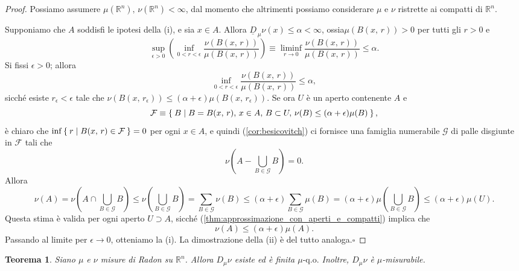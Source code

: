 \documentclass[a4paper,10pt,openright,oneside]{book}
\theoremstyle{theoremstyle}
\newtheorem{teorema}{Teorema}[section]
\theoremstyle{theoremstylewoheader}
\theoremstyle{theoremstyle}
\theoremstyle{proofsecstyle}
\theoremstyle{nonumberplain}
\newtheorem{proof}{Dim.}
\newcommand{\FF}{\ensuremath{\mathcal{F}}}
\newcommand{\GG}{\ensuremath{\mathcal{G}}}
\newcommand{\RR}{\ensuremath{\mathbb{R}}}
\newcommand{\lDer}[2]{\ensuremath{\underline{D}_{\,#2} #1}}
\newcommand{\Der}[2]{\ensuremath{D_#2 #1}}
\newcommand{\qo}[1]{\ensuremath{#1\text{-q.o.}}}
\renewcommand{\qedsymbol}{\ensuremath{\square}}
\newcommand{\qed}{\unskip\nobreak\hfill\nobreak\hspace{.5em}\qedsymbol}
\begin{document}
\begin{proof}
Possiamo assumere $\mu(\RR^n),\, \nu(\RR^n) < \infty$, dal momento che altrimenti possiamo considerare $\mu$ e $\nu$ ristrette ai compatti di $\RR^n$.

Supponiamo che $A$ soddisfi le ipotesi della (i), e sia $x \in A$. Allora $\lDer{\nu}{\mu}(x) \le \alpha < \infty$, ossia\linebreak $\mu(B(x,\, r)) > 0$ per tutti gli $r > 0$ e
\[
\sup_{\epsilon > 0} \left(\inf_{0 < r < \epsilon} \frac{\nu(B(x,\, r))}{\mu(B(x,\, r))}\right) \equiv \liminf_{r \to 0} \frac{\nu(B(x,\, r))}{\mu(B(x,\, r))} \le \alpha.
\]
Si fissi $\epsilon > 0$; allora
\[
\inf_{0 < r < \epsilon} \frac{\nu(B(x,\, r))}{\mu(B(x,\, r))} \le \alpha,
\]
sicché esiste $r_\epsilon < \epsilon$ tale che $\nu(B(x,\, r_\epsilon)) \le (\alpha + \epsilon)\mu(B(x,\, r_\epsilon))$. Se ora $U$ è un aperto contenente $A$ e
\[
\FF \equiv \Set{ B | B = B(x,\, r),\, x \in A,\, B \subset U,\, \nu(B) \le (\alpha + \epsilon)\mu(B) },
\]
è chiaro che $\inf\Set{ r | B(x,\, r) \in \FF } = 0$ per ogni $x \in A$, e quindi (\ref{cor:besicovitch}) ci fornisce una famiglia numerabile $\GG$ di palle disgiunte in $\FF$ tali che
\[
\nu \left(A - \bigcup_{B \in \GG} B\right) = 0.
\]
Allora
\[
\nu(A) = \nu\left(A \cap \bigcup_{B \in \GG} B\right) \le \nu\left(\bigcup_{B \in \GG} B\right) = \sum_{B \in \GG} \nu(B) \le (\alpha + \epsilon) \sum_{B \in \GG} \mu(B) = (\alpha+\epsilon)\mu\left(\bigcup_{B \in \GG} B\right) \le  (\alpha + \epsilon)\mu(U).
\]
Questa stima è valida per ogni aperto $U \supset A$, sicché (\ref{thm:approssimazione_con_aperti_e_compatti}) implica che
\[
\nu(A) \le (\alpha + \epsilon) \mu(A).
\]
Passando al limite per $\epsilon \to 0$, otteniamo la (i). La dimostrazione della (ii) è del tutto analoga.\qed
\end{proof}

\begin{teorema}
\label{thm:esistenza_derivate}
Siano $\mu$ e $\nu$ misure di Radon su $\RR^n$. Allora $\Der{\nu}{\mu}$ esiste ed è finita $\qo{\mu}$ Inoltre, $\Der{\nu}{\mu}$ è $\mu$-misurabile.
\end{teorema}
\end{document}
